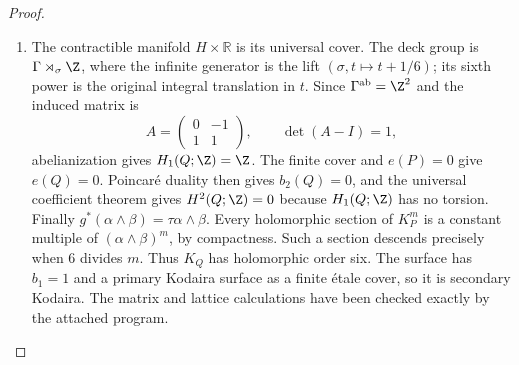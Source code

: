 \begin{proof}
\begin{enumerate}[label={$\langle1\rangle$\arabic*.},leftmargin=*]
\item The contractible manifold $H\times\mathbb R$ is its universal cover.
The deck group is $\Gamma\rtimes_\sigma\Z$, where the infinite
generator is the lift $(\sigma,t\mapsto t+1/6)$; its sixth power is
the original integral translation in $t$. Since
$\Gamma^{\rm ab}=\Z^2$ and the induced matrix is
\[
A=\begin{pmatrix}0&-1\\1&1\end{pmatrix},\qquad
\det(A-I)=1,
\]
abelianization gives $H_1(Q;\Z)=\Z$.
The finite cover and $e(P)=0$ give $e(Q)=0$. Poincar\'e duality then
gives $b_2(Q)=0$, and the universal coefficient theorem gives
$H^2(Q;\Z)=0$ because $H_1(Q;\Z)$ has no torsion.
Finally $g^*(\alpha\wedge\beta)=\tau\alpha\wedge\beta$.
Every holomorphic section of $K_P^m$ is a constant multiple of
$(\alpha\wedge\beta)^m$, by compactness. Such a section descends
precisely when $6$ divides $m$. Thus $K_Q$ has holomorphic order six.
The surface has $b_1=1$ and a primary Kodaira surface as a finite
\'etale cover, so it is secondary Kodaira. The matrix and lattice
calculations have been checked exactly by the attached program.

\end{enumerate}
\end{proof}
